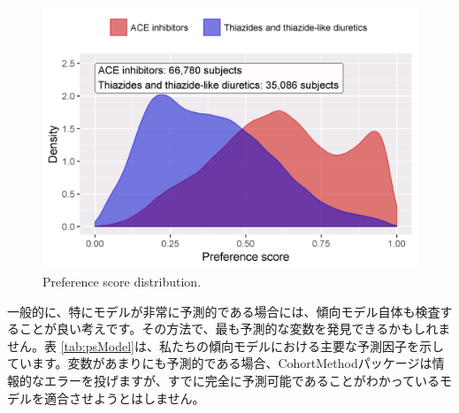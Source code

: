 \documentclass[
  11pt]{book}
\theoremstyle{definition}
\theoremstyle{definition}
\theoremstyle{definition}
\theoremstyle{definition}
\theoremstyle{remark}
\begin{document}
\begin{figure}

{\centering \includegraphics[width=0.8\linewidth]{images/PopulationLevelEstimation/ps} 

}

\caption{Preference score distribution.}\label{fig:ps}
\end{figure}

一般的に、特にモデルが非常に予測的である場合には、傾向モデル自体も検査することが良い考えです。その方法で、最も予測的な変数を発見できるかもしれません。表 \ref{tab:psModel}は、私たちの傾向モデルにおける主要な予測因子を示しています。変数があまりにも予測的である場合、CohortMethodパッケージは情報的なエラーを投げますが、すでに完全に予測可能であることがわかっているモデルを適合させようとはしません。 
\end{document}
